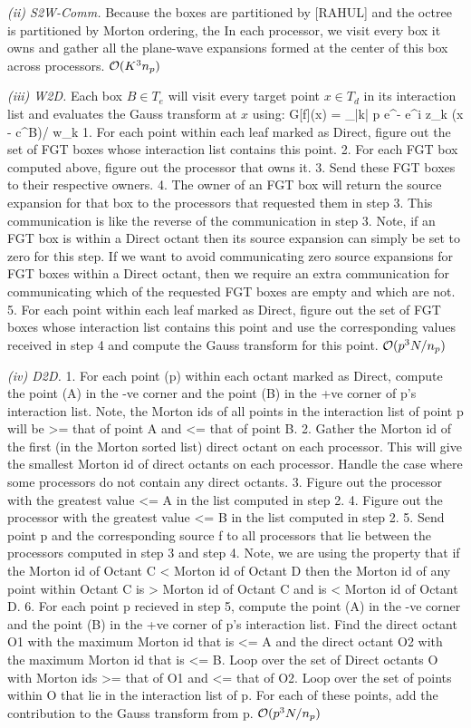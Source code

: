 {\em (ii) S2W-Comm.} Because the boxes are partitioned by [RAHUL] and the octree is partitioned by Morton ordering, the  
In each processor, we visit every box it owns and gather all the plane-wave expansions formed at the center of this box across processors. 
\hfill $\mathcal{O}(K^3 n_p)$

{\em (iii) W2D.} Each box $B \in T_e$ will visit every target point $x \in T_d$ in its interaction list and evaluates the Gauss transform at $x$ using:
%
\beq G[f](x) = \sum_{|k| \leq p} e^{-} e^{i z_k \cdot (x - c^B)/\sqrt{\delta}} w_k \eeq
%
1. For each point within each leaf marked as Direct, figure out the set of
FGT boxes whose interaction list contains this point.
2. For each FGT box computed above, figure out the processor that owns
it.
3. Send these FGT boxes to their respective owners.
4. The owner of an FGT box will return the source expansion for that box
to the processors that requested them in step 3. This communication is
like the reverse of the communication in step 3. Note, if an FGT box is
within a Direct octant then its source expansion can simply be set to
zero for this step. If we want to avoid communicating zero source 
expansions for FGT boxes within a Direct octant, then we require an extra 
communication for communicating which of the requested FGT boxes are empty and which are
not.  
5. For each point within each leaf marked as Direct, figure out the set
of FGT boxes whose interaction list contains this point and use the
corresponding values received in step 4 and compute the Gauss transform for this
point.
\hfill $\mathcal{O}(p^3 N / n_p)$

{\em (iv) D2D.}
1. For each point (p) within each octant marked as Direct, compute the
point (A) in the -ve corner and the point (B) in the +ve corner of p's
interaction list. Note, the Morton ids of all points in the interaction
list of point p will be >= that of point A and <= that of point B.
2. Gather the Morton id of the first (in the Morton sorted list) direct
octant on each processor. This will give the smallest Morton id of
direct octants on each processor. Handle the case where some processors
do not contain any direct octants.
3. Figure out the processor with the greatest value <= A in the list
computed in step 2.
4. Figure out the processor with the greatest value <= B in the list
computed in step 2.
5. Send point p and the corresponding source f to all processors that
lie between the processors computed in step 3 and step 4. Note, we are 
using the property that if the Morton id of Octant C < Morton id of 
Octant D then the Morton id of any point within Octant C is >  Morton
id of Octant C and is < Morton id of Octant D.
6. For each point p recieved in step 5, compute the
point (A) in the -ve corner and the point (B) in the +ve corner of p's
interaction list. Find the direct octant O1 with the maximum Morton id that
is <= A and the direct octant O2 with the maximum Morton id that is <=
B. Loop over the set of Direct octants O with Morton ids >= that of O1
and <= that of O2. Loop over the set of points within O that lie in the
interaction list of p. For each of these points, add the contribution to
the Gauss transform from p.
\hfill $\mathcal{O}(p^3 N/n_p)$

